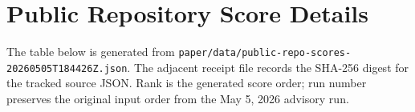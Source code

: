 \section{Public Repository Score Details}

The table below is generated from \texttt{paper/data/public-repo-scores-20260505T184426Z.json}. The adjacent receipt file records the SHA-256 digest for the tracked source JSON. Rank is the generated score order; run number preserves the original input order from the May 5, 2026 advisory run.

\PublicRepoScoreAppendixTable
